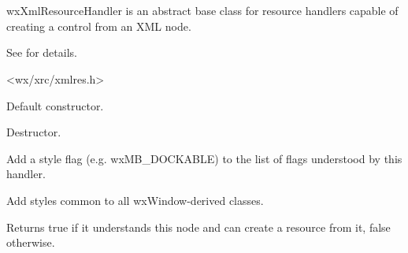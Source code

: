 %
%

\section{}\label{wxxmlresourcehandler}

wxXmlResourceHandler is an abstract base class for resource handlers
capable of creating a control from an XML node.

See  for details.




<wx/xrc/xmlres.h>


\label{wxxmlresourcehandlerctor}


Default constructor.

\label{wxxmlresourcehandlerdtor}


Destructor.

\label{wxxmlresourcehandleraddstyle}


Add a style flag (e.g. wxMB\_DOCKABLE) to the list of flags
understood by this handler.

\label{wxxmlresourcehandleraddwindowstyles}


Add styles common to all wxWindow-derived classes.

\label{wxxmlresourcehandlercanhandle}


Returns true if it understands this node and can create
a resource from it, false otherwise.

